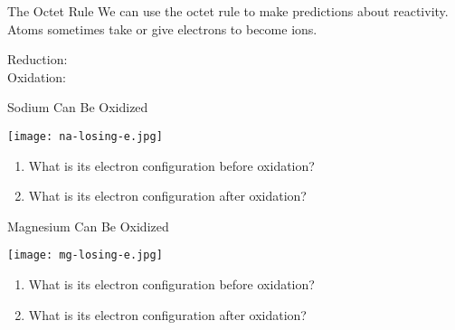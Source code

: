\documentclass[notes=only]{beamer}
\begin{document}
\begin{frame}[t]{The Octet Rule}
	We can use the octet rule to make predictions about reactivity. Atoms
	sometimes take or give electrons to become \alert{ions}.
	\begin{description}
		\item[Reduction:] 

		\vfill

	\item[Oxidation:] 

		\vfill

		\null
	\end{description}
\end{frame}

\begin{frame}[t]{Sodium Can Be Oxidized}
	\begin{center}
		\texttt{[image: na-losing-e.jpg]}
	\end{center}

	\begin{enumerate}
		\item What is its electron configuration \alert{before}
			oxidation?

			\vfill

		\item What is its electron configuration \alert{after} oxidation?

			\vfill

			\null
	\end{enumerate}
\end{frame}

\begin{frame}[t]{Magnesium Can Be Oxidized}
	\begin{center}
		\texttt{[image: mg-losing-e.jpg]}
	\end{center}

	\begin{enumerate}
		\item What is its electron configuration \alert{before}
			oxidation?

			\vfill

		\item What is its electron configuration \alert{after} oxidation?
			
			\vfill

			\null
	\end{enumerate}
\end{frame}
\end{document}
